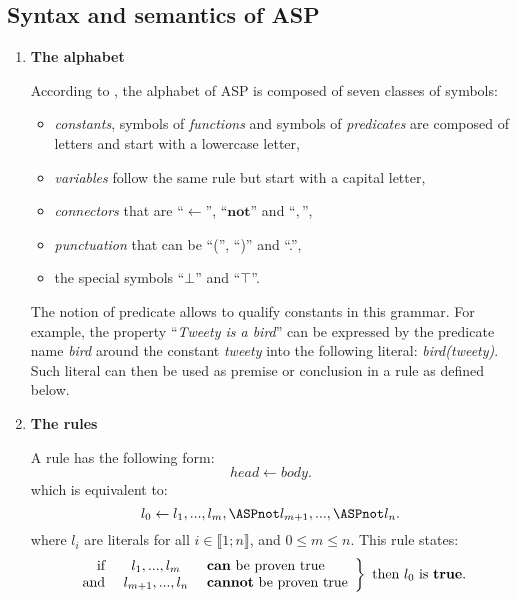 \subsection*{Syntax and semantics of ASP}
\label{sectionSyntaxeASP}
\begin{enumerate}

\item \textbf{The alphabet}

According to \cite{baral2003knowledge}, the alphabet of ASP is composed of seven classes of symbols:
\begin{itemize}
  \item \emph{constants}, symbols of \emph{functions} and symbols of \emph{predicates} are composed of letters and start with a lowercase letter,
  \item \emph{variables} follow the same rule but start with a capital letter,
  \item \emph{connectors} that are ``$\leftarrow$'', ``$\textbf{not}$'' and ``$,$'',
  \item \emph{punctuation} that can be ``('', ``)'' and ``.'',
  \item the special symbols ``$\bot$'' and ``$\top$''.
\end{itemize}

The notion of predicate allows to qualify constants in this grammar.
For example, the property ``\textit{Tweety is a bird}''
can be expressed by the predicate name \textit{bird}
around the constant \textit{tweety} into the following literal:
\textit{bird(tweety)}.
Such literal can then be used as premise or conclusion in a rule as defined below.

\item \textbf{The rules}

A rule has the following form:
\begin{equation} \label{eq1ASP}
 head \leftarrow body.
\end{equation}
which is equivalent to:
\begin{equation} \label{eq2ASP}
l_{0} \leftarrow l_{1},...,l_{m}, \ASPnot l_{m+1},..., \ASPnot l_{n}.
\end{equation}
where $l_{i}$ are literals for all $i \in \llbracket 1 ; n \rrbracket$, and $0 \leq m \leq n$.
This rule states:
\[
\left.
    \begin{array}{rcl}
        \text{if } & l_{1},...,l_{m}  & \text{ \textbf{can} be proven true}\\
        \text{and } & l_{m+1},...,l_{n} & \text{ \textbf{cannot} be proven true}
    \end{array}
\right \} \text{ then} ~ l_{0} ~ \text{is } \\ \textbf{true}.
\]


\end{enumerate}
